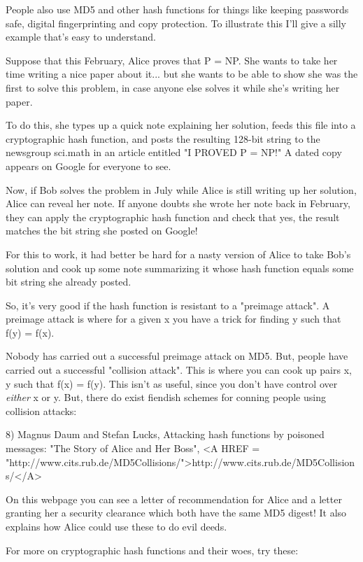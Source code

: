 People also use MD5 and other hash functions for things like keeping
passwords safe, digital
fingerprinting and copy protection.   To illustrate this I'll give a
silly example that's easy to understand.

Suppose that this February, Alice proves that P = NP.  She wants to 
take her time writing a nice paper about it... but she wants to be 
able to show she was the first to solve this problem, in case anyone 
else solves it while she's writing her paper.

To do this, she types up a quick note explaining her solution, feeds 
this file into a cryptographic hash function, and posts the resulting 
128-bit string to the newsgroup sci.math in an article entitled 
"I PROVED P = NP!"  A dated copy appears on Google for everyone to see.

Now, if Bob solves the problem in July while Alice is still writing up 
her solution, Alice can reveal her note.  If anyone doubts she wrote
her note back in February, they can apply the cryptographic hash function
and check that yes, the result matches the bit string she posted on Google!

For this to work, it had better be hard for a nasty version of Alice
to take Bob's solution and cook up some note summarizing it whose hash 
function equals some bit string she already posted.  

So, it's very good if the hash function is resistant to a "preimage 
attack".  A preimage attack is where for a given x you have a trick 
for finding y such that f(y) = f(x).  

Nobody has carried out a successful preimage attack on MD5.  But, 
people have carried out a successful "collision attack".  This is 
where you can cook up pairs x, y such that f(x) = f(y).  This isn't 
as useful, since you don't have control over \emph{either} x or y.  But, 
there do exist fiendish schemes for conning people using collision attacks:

8) Magnus Daum and Stefan Lucks, Attacking hash functions by poisoned messages: 
"The Story of Alice and Her Boss", <A HREF = "http://www.cits.rub.de/MD5Collisions/">http://www.cits.rub.de/MD5Collisions/</A>

On this webpage you can see a letter of recommendation for Alice and
a letter granting her a security clearance which both have the same MD5
digest!  It also explains how Alice could use these to do evil deeds.

For more on cryptographic hash functions and their woes, try these:

